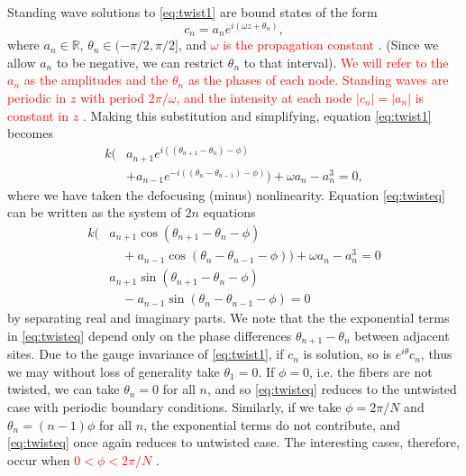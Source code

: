 \documentclass[reprint, amsmath,amssymb,aps,pra]{revtex4-2}
\def\R{{\mathbb R}}
\renewcommand{\revised}[1]{ \textcolor{red}{#1} }
\begin{document}
Standing wave solutions to \cref{eq:twist1} are bound states of the form
\begin{equation}\label{eq:ansatz1}
c_n = a_n e^{i (\omega z + \theta_n) },
\end{equation}
where $a_n \in \R$, $\theta_n \in (-\pi/2, \pi/2]$, and \revised{$\omega$ is the propagation constant}. (Since we allow $a_n$ to be negative, we can restrict $\theta_n$ to that interval). \revised{We will refer to the $a_n$ as the amplitudes and the $\theta_n$ as the phases of each node. Standing waves are periodic in $z$ with period $2\pi/\omega$, and the intensity at each node $|c_n| = |a_n|$ is constant in $z$}.
Making this substitution and simplifying, equation \cref{eq:twist1} becomes
\begin{equation}\label{eq:twisteq}
\begin{aligned}
k\Big( &a_{n+1} e^{i((\theta_{n+1}-\theta_n)-\phi)} \\
&+ a_{n-1} e^{-i((\theta_n - \theta_{n-1})-\phi)}\Big) + \omega a_n - a_n^3 = 0,
\end{aligned}
\end{equation}
where we have taken the defocusing (minus) nonlinearity. Equation \cref{eq:twisteq} can be written as the system of $2n$ equations
\begin{equation}\label{eq:twisteqreal}
\begin{aligned}
k\big( &a_{n+1} \cos(\theta_{n+1}-\theta_n-\phi) \\
&\quad+a_{n-1} \cos(\theta_n - \theta_{n-1}-\phi)\big) + \omega a_n -  a_n^3 = 0 \\\
&a_{n+1} \sin(\theta_{n+1}-\theta_n-\phi) \\
&\quad-a_{n-1} \sin(\theta_n - \theta_{n-1}-\phi) = 0
\end{aligned}
\end{equation}
by separating real and imaginary parts. We note that the the exponential terms in \cref{eq:twisteq} depend only on the phase differences $\theta_{n+1}-\theta_n$ between adjacent sites. Due to the gauge invariance of \cref{eq:twist1}, if $c_n$ is solution, so is $e^{i \theta} c_n$, thus we may without loss of generality take $\theta_1 = 0$. If $\phi = 0$, i.e. the fibers are not twisted, we can take $\theta_n = 0$ for all $n$, and so \cref{eq:twisteq} reduces to the untwisted case with periodic boundary conditions. Similarly, if we take $\phi = 2 \pi/N$ and $\theta_n = (n-1)\phi$ for all $n$, the exponential terms do not contribute, and \cref{eq:twisteq} once again reduces to untwisted case. The interesting cases, therefore, occur when \revised{$0 < \phi < 2 \pi/N$}. 
\end{document}
